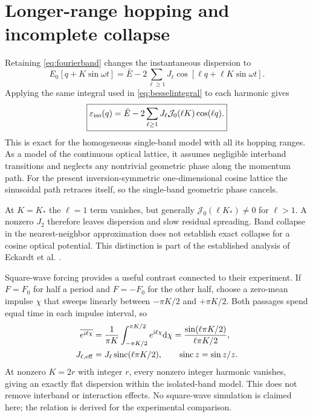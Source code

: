 \documentclass[11pt,oneside]{report}
\numberwithin{equation}{chapter}
\newcommand{\ii}{\mathrm i}
\newcommand{\dd}{\mathrm d}
\begin{document}
\section{Longer-range hopping and incomplete collapse}
Retaining \cref{eq:fourierband} changes the instantaneous dispersion to
\begin{equation}
 E_0[q+K\sin\omega t]=\bar E-2\sum_{\ell\geq1}J_\ell\cos[\ell q+\ell K\sin\omega t].
\end{equation}
Applying the same integral used in \cref{eq:besselintegral} to each harmonic gives
\begin{equation}\label{eq:longrangequasi}
 \boxed{\varepsilon_{\rm iso}(q)=\bar E-2\sum_{\ell\geq1}J_\ell\mathcal J_0(\ell K)\cos(\ell q).}
\end{equation}
This is exact for the homogeneous single-band model with all its hopping ranges. As a model of the continuous optical lattice, it assumes negligible interband transitions and neglects any nontrivial geometric phase along the momentum path. For the present inversion-symmetric one-dimensional cosine lattice the sinusoidal path retraces itself, so the single-band geometric phase cancels.

At $K=K_*$ the $\ell=1$ term vanishes, but generally $\mathcal J_0(\ell K_*)\ne0$ for $\ell>1$. A nonzero $J_2$ therefore leaves dispersion and slow residual spreading. Band collapse in the nearest-neighbor approximation does not establish exact collapse for a cosine optical potential. This distinction is part of the established analysis of Eckardt et al. \cite{Eckardt2009}.

Square-wave forcing provides a useful contrast connected to their experiment. If $F=F_0$ for half a period and $F=-F_0$ for the other half, choose a zero-mean impulse $\chi$ that sweeps linearly between $-\pi K/2$ and $+\pi K/2$. Both passages spend equal time in each impulse interval, so
\begin{align}
 \overline{e^{\ii\ell\chi}}&=\frac{1}{\pi K}\int_{-\pi K/2}^{\pi K/2}e^{\ii\ell\chi}\dd\chi
 =\frac{\sin(\ell\pi K/2)}{\ell\pi K/2},\\
 J_{\ell,\rm eff}&=J_\ell\operatorname{sinc}(\ell\pi K/2),\qquad \operatorname{sinc}z=\sin z/z.
\end{align}
At nonzero $K=2r$ with integer $r$, every nonzero integer harmonic vanishes, giving an exactly flat dispersion within the isolated-band model. This does not remove interband or interaction effects. No square-wave simulation is claimed here; the relation is derived for the experimental comparison.
\end{document}
